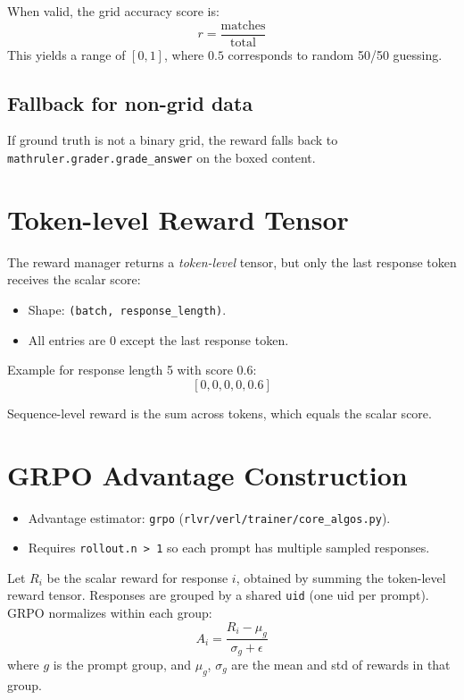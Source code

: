 \documentclass[11pt]{article}
\begin{document}
When valid, the grid accuracy score is:
\begin{equation}
  r = \frac{\text{matches}}{\text{total}}
\end{equation}
This yields a range of \([0, 1]\), where \(0.5\) corresponds to random 50/50 guessing.

\subsection{Fallback for non-grid data}
If ground truth is not a binary grid, the reward falls back to \texttt{mathruler.grader.grade\_answer} on the boxed content.

\section{Token-level Reward Tensor}
The reward manager returns a \emph{token-level} tensor, but only the last response token receives the scalar score:
\begin{itemize}
  \item Shape: \texttt{(batch, response\_length)}.
  \item All entries are \(0\) except the last response token.
\end{itemize}

Example for response length 5 with score \(0.6\):
\[ [0, 0, 0, 0, 0.6] \]

Sequence-level reward is the sum across tokens, which equals the scalar score.

\section{GRPO Advantage Construction}
\begin{itemize}
  \item Advantage estimator: \texttt{grpo} (\texttt{rlvr/verl/trainer/core\_algos.py}).
  \item Requires \texttt{rollout.n > 1} so each prompt has multiple sampled responses.
\end{itemize}

Let \(R_i\) be the scalar reward for response \(i\), obtained by summing the token-level reward tensor. Responses are grouped by a shared \texttt{uid} (one uid per prompt). GRPO normalizes within each group:
\begin{equation}
  A_i = \frac{R_i - \mu_{g}}{\sigma_{g} + \epsilon}
\end{equation}
where \(g\) is the prompt group, and \(\mu_g\), \(\sigma_g\) are the mean and std of rewards in that group.
\end{document}
